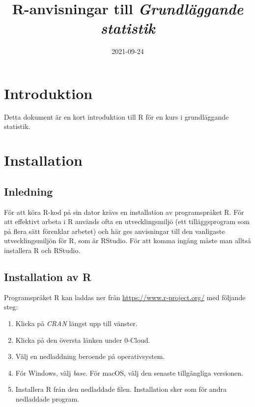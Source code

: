 \documentclass[
]{book}
\title{R-anvisningar till \emph{Grundläggande statistik}}
\author{}
\date{\vspace{-2.5em}2021-09-24}
\providecommand{\tightlist}{%
  \setlength{\itemsep}{0pt}\setlength{\parskip}{0pt}}
\theoremstyle{definition}
\theoremstyle{definition}
\theoremstyle{definition}
\theoremstyle{definition}
\theoremstyle{remark}
\begin{document}
\maketitle

{
\setcounter{tocdepth}{1}
\tableofcontents
}
\hypertarget{introduktion}{%
\chapter{Introduktion}\label{introduktion}}

Detta dokument är en kort introduktion till R för en kurs i grundläggande statistik.

\hypertarget{installation}{%
\chapter{Installation}\label{installation}}

\hypertarget{inledning}{%
\section{Inledning}\label{inledning}}

För att köra R-kod på sin dator krävs en installation av programspråket R. För att effektivt arbeta i R används ofta en utvecklingsmiljö (ett tilläggsprogram som på flera sätt förenklar arbetet) och här ges anvisningar till den vanligaste utvecklingsmiljön för R, som är RStudio. För att komma ingång måste man alltså installera R och RStudio.

\hypertarget{installation-av-r}{%
\section{Installation av R}\label{installation-av-r}}

Programspråket R kan laddas ner från \url{https://www.r-project.org/} med följande steg:

\begin{enumerate}
\def\labelenumi{\arabic{enumi}.}
\tightlist
\item
  Klicka på \emph{CRAN} längst upp till vänster.
\item
  Klicka på den översta länken under 0-Cloud.
\item
  Välj en nedladdning beroende på operativsystem.
\item
  För Windows, välj \emph{base}. För macOS, välj den senaste tillgängliga versionen.
\item
  Installera R från den nedladdade filen. Installation sker som för andra nedladdade program.
\end{enumerate}
\end{document}
